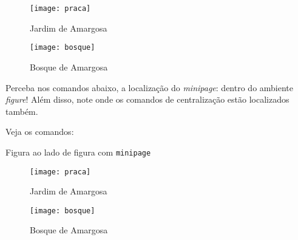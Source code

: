 \begin{figure}[!htbp]
	\begin{minipage}[b]{0.45\linewidth}
	\centering
	\texttt{[image: praca]}
	\caption{Jardim de Amargosa}
	\label{fig:praca}
	\end{minipage}
	\hfill
	\begin{minipage}[b]{0.45\linewidth}
	\centering
	\texttt{[image: bosque]}
	\caption{Bosque de Amargosa}
	\label{fig:bosque}
	\end{minipage}
\end{figure}

Perceba nos comandos abaixo, a localização do \textit{minipage}: dentro do 
ambiente \textit{figure}!
Além disso, note onde os comandos de centralização estão localizados também.

Veja os comandos:

\begin{codigo}{Figura ao lado de figura com \texttt{minipage}}{\lapis}
\begin{figure}[!htbp]
	\begin{minipage}[b]{0.45\linewidth}
	\centering
	\texttt{[image: praca]}
	\caption{Jardim de Amargosa}
	\label{fig:praca}
	\end{minipage}
	\hfill
	\begin{minipage}[b]{0.45\linewidth}
	\centering
	\texttt{[image: bosque]}
	\caption{Bosque de Amargosa}
	\label{fig:bosque}
	\end{minipage}
\end{figure}
\end{codigo}

\newpage